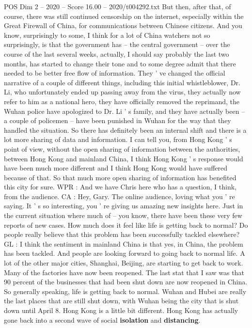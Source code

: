\begin{textsample}{POS Dim 2 – 2020 – Score 16.00 – 2020/t004292.txt}
But then, after that, of course, there was still continued censorship on the internet, especially within the Great Firewall of China, for communications between Chinese citizens.
And you know, surprisingly to some, I think for a lot of China watchers not so surprisingly, is that the government has -- the central government -- over the course of the last several weeks, actually, I should say probably the last two months, has started to change their tone and to some degree admit that there needed to be better free flow of information.
They ' ve changed the official narrative of a couple of different things, including this initial whistleblower, Dr.
Li, who unfortunately ended up passing away from the virus, they actually now refer to him as a national hero, they have officially removed the reprimand, the Wuhan police have apologized to Dr.
Li ' s family, and they have actually been -- a couple of policemen -- have been punished in Wuhan for the way that they handled the situation.
So there has definitely been an internal shift and there is a lot more sharing of data and information.
I can tell you, from Hong Kong ' s point of view, without the open sharing of information between the authorities, between Hong Kong and mainland China, I think Hong Kong ' s response would have been much more different and I think Hong Kong would have suffered because of that.
So that much more open sharing of information has benefited this city for sure.
WPR : And we have Chris here who has a question, I think, from the audience.
CA : Hey, Gary.
The online audience, loving what you ' re saying.
It ' s so interesting, you ' re giving us amazing new insights here.
Just in the current situation where much of -- you know, there have been these very few reports of new cases.
How much does it feel like life is getting back to normal?
Do people really believe that this problem has been successfully tackled elsewhere?
GL : I think the sentiment in mainland China is that yes, in China, the problem has been tackled.
And people are looking forward to going back to normal life.
A lot of the other major cities, Shanghai, Beijing, are starting to get back to work.
Many of the factories have now been reopened.
The last stat that I saw was that 90 percent of the businesses that had been shut down are now reopened in China.
So generally speaking, life is getting back to normal.
Wuhan and Hubei are really the last places that are still shut down, with Wuhan being the city that is shut down until April 8.
Hong Kong is a little bit different.
Hong Kong has actually gone back into a second wave of social \textbf{isolation} and \textbf{distancing}.

\end{textsample}
